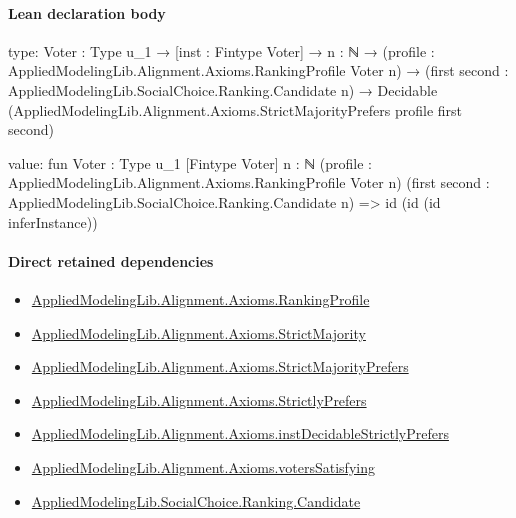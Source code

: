\documentclass[10pt]{article}
\begin{document}
\paragraph{Lean declaration body}
\begin{ReviewVerbatim}
type:
{Voter : Type u_1} →
  [inst : Fintype Voter] →
    {n : ℕ} →
      (profile : AppliedModelingLib.Alignment.Axioms.RankingProfile Voter n) →
        (first second : AppliedModelingLib.SocialChoice.Ranking.Candidate n) →
          Decidable (AppliedModelingLib.Alignment.Axioms.StrictMajorityPrefers profile first second)

value:
fun {Voter : Type u_1} [Fintype Voter] {n : ℕ} (profile : AppliedModelingLib.Alignment.Axioms.RankingProfile Voter n)
    (first second : AppliedModelingLib.SocialChoice.Ranking.Candidate n) =>
  id (id (id inferInstance))
\end{ReviewVerbatim}

\paragraph{Direct retained dependencies}
\begin{itemize}\raggedright
\item \hyperlink{library-prerequisite-9bded048a60dfe0a}{Applied\allowbreak{}Modeling\allowbreak{}Lib.\allowbreak{}Alignment.\allowbreak{}Axioms.\allowbreak{}Ranking\allowbreak{}Profile}
\item \hyperlink{governing-declaration-975eb89ae7276be7}{Applied\allowbreak{}Modeling\allowbreak{}Lib.\allowbreak{}Alignment.\allowbreak{}Axioms.\allowbreak{}Strict\allowbreak{}Majority}
\item \hyperlink{governing-declaration-a094f6e94e1e1408}{Applied\allowbreak{}Modeling\allowbreak{}Lib.\allowbreak{}Alignment.\allowbreak{}Axioms.\allowbreak{}Strict\allowbreak{}Majority\allowbreak{}Prefers}
\item \hyperlink{library-prerequisite-191720c2353b55e9}{Applied\allowbreak{}Modeling\allowbreak{}Lib.\allowbreak{}Alignment.\allowbreak{}Axioms.\allowbreak{}Strictly\allowbreak{}Prefers}
\item \hyperlink{governing-declaration-b77c4838760c68c9}{Applied\allowbreak{}Modeling\allowbreak{}Lib.\allowbreak{}Alignment.\allowbreak{}Axioms.\allowbreak{}inst\allowbreak{}Decidable\allowbreak{}Strictly\allowbreak{}Prefers}
\item \hyperlink{governing-declaration-81017bb8356c8ad1}{Applied\allowbreak{}Modeling\allowbreak{}Lib.\allowbreak{}Alignment.\allowbreak{}Axioms.\allowbreak{}voters\allowbreak{}Satisfying}
\item \hyperlink{library-prerequisite-8c0e6c25845ae78a}{Applied\allowbreak{}Modeling\allowbreak{}Lib.\allowbreak{}Social\allowbreak{}Choice.\allowbreak{}Ranking.\allowbreak{}Candidate}
\end{itemize}
\hypertarget{governing-declaration-d5e7d2376e0718c7}{}
\end{document}
